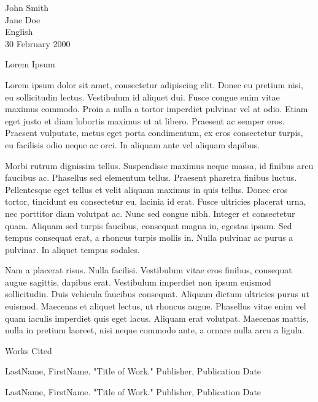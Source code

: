 \documentclass[12pt, letterpaper]{article}
\newcommand{\bibent}{\noindent \hangindent 40pt}
\newenvironment{workscited}{\newpage \begin{center} Works Cited \end{center}}{\newpage }
\begin{document}
\begin{flushleft}

John Smith\\
Jane Doe\\
English\\
30 February 2000\\

\begin{center}
Lorem Ipsum
\end{center}

\setlength{\parindent}{0.5in}


Lorem ipsum dolor sit amet, consectetur adipiscing elit. Donec eu pretium nisi, eu sollicitudin lectus. Vestibulum id aliquet dui. Fusce congue enim vitae maximus commodo. Proin a nulla a tortor imperdiet pulvinar vel at odio. Etiam eget justo et diam lobortis maximus ut at libero. Praesent ac semper eros. Praesent vulputate, metus eget porta condimentum, ex eros consectetur turpis, eu facilisis odio neque ac orci. In aliquam ante vel aliquam dapibus.

Morbi rutrum dignissim tellus. Suspendisse maximus neque massa, id finibus arcu faucibus ac. Phasellus sed elementum tellus. Praesent pharetra finibus luctus. Pellentesque eget tellus et velit aliquam maximus in quis tellus. Donec eros tortor, tincidunt eu consectetur eu, lacinia id erat. Fusce ultricies placerat urna, nec porttitor diam volutpat ac. Nunc sed congue nibh. Integer et consectetur quam. Aliquam sed turpis faucibus, consequat magna in, egestas ipsum. Sed tempus consequat erat, a rhoncus turpis mollis in. Nulla pulvinar ac purus a pulvinar. In aliquet tempus sodales.

Nam a placerat risus. Nulla facilisi. Vestibulum vitae eros finibus, consequat augue sagittis, dapibus erat. Vestibulum imperdiet non ipsum euismod sollicitudin. Duis vehicula faucibus consequat. Aliquam dictum ultricies purus ut euismod. Maecenas et aliquet lectus, ut rhoncus augue. Phasellus vitae enim vel quam iaculis imperdiet quis eget lacus. Aliquam erat volutpat. Maecenas mattis, nulla in pretium laoreet, nisi neque commodo ante, a ornare nulla arcu a ligula.

\newpage

\begin{workscited}

\bibent
LastName, FirstName. "Title of Work." Publisher, Publication Date

\bibent
LastName, FirstName. "Title of Work." Publisher, Publication Date

\end{workscited}

\end{flushleft}
\end{document}
